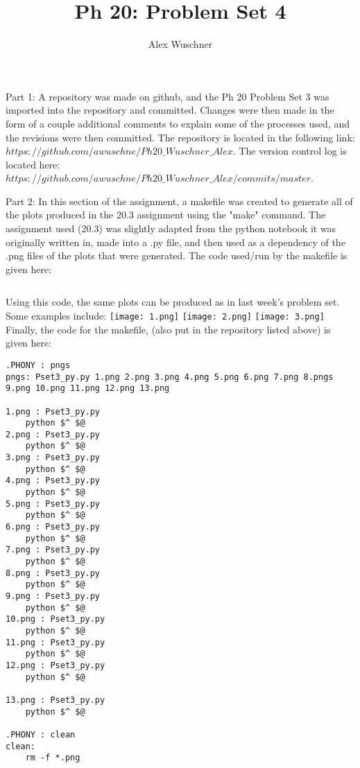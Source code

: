 \documentclass{article}
\begin{document}
\title{Ph 20: Problem Set 4}
\author{Alex Wuschner}
\maketitle
Part 1:\newline
A repository was made on github, and the Ph 20 Problem Set 3 was imported into the repository and committed. Changes were then made in the form of a couple additional comments to explain some of the processes used, and the revisions were then committed. The repository is located in the following link: $https://github.com/awuschne/Ph20\_Wuschner\_Alex$.  The version control log is located here: $https://github.com/awuschne/Ph20\_Wuschner\_Alex/commits/master$.\newline

Part 2: \newline
In this section of the assignment, a makefile was created to generate all of the plots produced in the 20.3 assignment using the "make" command.  The assignment used (20.3) was slightly adapted from the python notebook it was originally written in, made into a .py file, and then used as a dependency of the .png files of the plots that were generated.  The code used/run by the makefile is given here:\newline
\inputminted{python}{Pset3_py.py}
Using this code, the same plots can be produced as in last week's problem set.  Some examples include:\newline
\texttt{[image: 1.png]}\newline
\texttt{[image: 2.png]}\newline
\texttt{[image: 3.png]}\newline
Finally, the code for the makefile, (also put in the repository listed above) is given here:
\begin{lstlisting}
.PHONY : pngs
pngs: Pset3_py.py 1.png 2.png 3.png 4.png 5.png 6.png 7.png 8.pngs 9.png 10.png 11.png 12.png 13.png

1.png : Pset3_py.py
	python $^ $@
2.png : Pset3_py.py
	python $^ $@
3.png : Pset3_py.py
	python $^ $@
4.png : Pset3_py.py
	python $^ $@
5.png : Pset3_py.py
	python $^ $@
6.png : Pset3_py.py
	python $^ $@
7.png : Pset3_py.py
	python $^ $@
8.png : Pset3_py.py
	python $^ $@
9.png : Pset3_py.py
	python $^ $@
10.png : Pset3_py.py
	python $^ $@
11.png : Pset3_py.py
	python $^ $@
12.png : Pset3_py.py
	python $^ $@

13.png : Pset3_py.py
	python $^ $@

.PHONY : clean
clean:
	rm -f *.png
\end{lstlisting}
\end{document}
